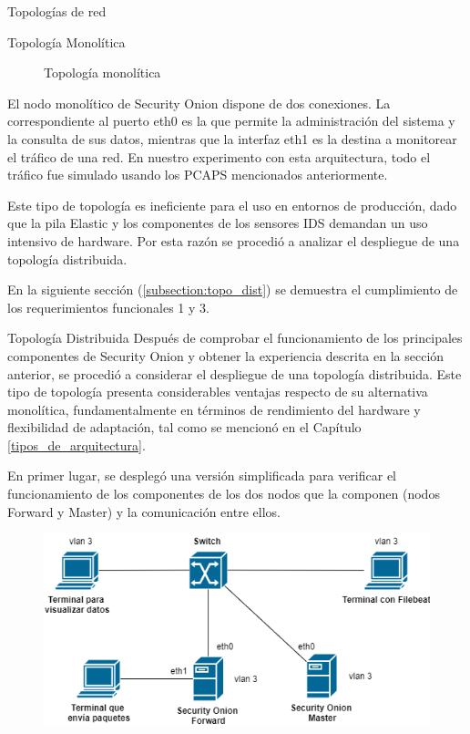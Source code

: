 \begin{section}{Topologías de red }
\begin{subsection} {Topología Monolítica}
\begin{figure}[H]
            \caption{Topología monolítica}
            \label{fig:figura_33_a}
            \end{figure}
            El nodo monolítico de Security Onion dispone de dos conexiones. La correspondiente al puerto eth0 es la que permite la administración del sistema y la consulta de sus datos, mientras que la interfaz eth1 es la destina a monitorear el tráfico de una red. En nuestro experimento con esta arquitectura, todo el tráfico fue simulado usando los PCAPS mencionados anteriormente. \par
            Este tipo de topología es ineficiente para el uso en entornos de producción, dado que la pila Elastic y los componentes de los sensores IDS demandan un uso intensivo de hardware. Por esta razón se procedió a analizar el despliegue de una topología distribuida.
            \par
            En la siguiente sección (\ref{subsection:topo_dist}) se demuestra el cumplimiento de los requerimientos funcionales 1 y 3.
        \end{subsection}
        \begin{subsection} {Topología Distribuida}
        \label{subsection:topo_dist}
            Después de comprobar el funcionamiento de los principales componentes de Security Onion y obtener la experiencia descrita en la sección anterior, se procedió a considerar el despliegue de una topología distribuida. Este tipo de topología presenta considerables ventajas respecto de su alternativa monolítica, fundamentalmente en términos de rendimiento del hardware y flexibilidad de adaptación, tal como se mencionó en el Capítulo  \ref{tipos_de_arquitectura}. \par
            En primer lugar, se desplegó una versión simplificada para verificar el funcionamiento de los componentes de los dos nodos que la componen (nodos Forward y Master) y la comunicación entre ellos.\par
            \begin{figure}[H]
                \centering
                \includegraphics[width=1\textwidth]{./iteracion_1_imagenes/figura_33_b_topologia_de_prueba_2.png}

\end{figure}
\end{subsection}
\end{section}
